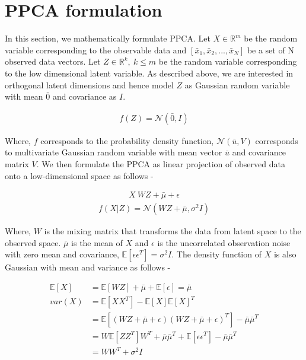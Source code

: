 

\section{PPCA formulation}

In this section, we mathematically formulate PPCA. Let $X \in \mathbb{R}^m$ be the random variable corresponding to the observable data and $[\bar{x}_1, \bar{x}_2, ...,\bar{x}_N]$ be a set of N observed data vectors. Let $Z \in \mathbb{R}^k, \: k \leq m$ be the random variable corresponding to the low dimensional latent variable. As described above, we are interested in orthogonal latent dimensions and hence model $Z$ as Gaussian random variable with mean $\bar{0}$ and covariance as $I$. 

\begin{align}
	f(Z) = \mathcal{N}(\bar{0}, I) 
\end{align} 

Where, $f$ corresponds to the probability density function, $\mathcal{N}(\bar{u}, V)$ corresponds to multivariate Gaussian random variable with mean vector $\bar{u}$ and covariance matrix $V$.  We then formulate the PPCA as linear projection of observed data onto a low-dimensional space as follows - 

\begin{align}
	X ~ WZ + \bar{\mu} + \epsilon 
\end{align} 
\begin{align}
	f(X|Z) = \mathcal{N}(WZ + \bar{\mu}, \sigma^2I) \label{eq2}
\end{align} 

Where, $W$ is the mixing matrix that transforms the data from latent space to the observed space. $\bar{\mu}$ is the mean of $X$ and $\epsilon$ is the uncorrelated observation noise with zero mean and covariance, $\mathbb{E}[\epsilon \epsilon^T] = \sigma^2 I$. The density function of $X$ is also Gaussian with mean and variance as follows - 

 \begin{align*}
	\mathbb{E}[X] &= \mathbb{E}[WZ] +  \bar{\mu} + \mathbb{E}[\epsilon] = \bar{\mu} \\
	var(X) &= \mathbb{E}[XX^T] - \mathbb{E}[X]\mathbb{E}[X]^T \\
		&= \mathbb{E}[ (WZ + \bar{\mu} + \epsilon) (WZ + \bar{\mu} + \epsilon)^T] - \bar{\mu}\bar{\mu}^T \\
		&= W \mathbb{E}[ZZ^T] W^T + \bar{\mu}\bar{\mu}^T +  \mathbb{E}[\epsilon \epsilon^T] - \bar{\mu}\bar{\mu}^T \\
		& = WW^T + \sigma^2 I
\end{align*} 

